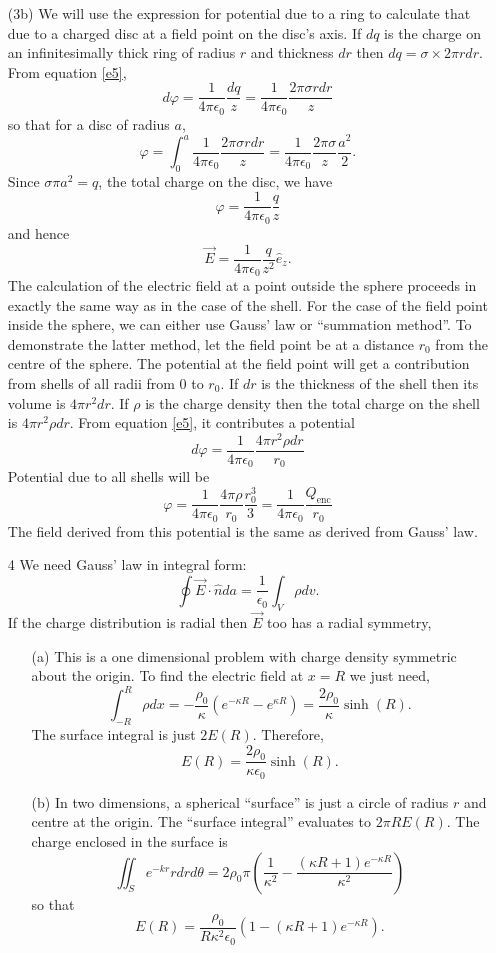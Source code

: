 \documentclass{article}
\newcommand{\un}{\hat{n}}
\newcommand{\uv}[1]{\hat{e}_{#1}}
\newcommand{\ke}{\frac{1}{4\pi\epsilon_0}}
\begin{document}
\begin{enumerate}
\item[(3b)] We will use the expression for potential due to a ring to calculate 
that due to a charged disc at a field point on the disc's axis. If $dq$ is the 
charge on an infinitesimally thick ring of radius $r$ and thickness $dr$ then 
$dq = \sigma \times 2\pi rdr$. From equation \eqref{e5},
\[
d\varphi = \ke\frac{dq}{z} = \ke\frac{2\pi\sigma rdr}{z}
\]
so that for a disc of radius $a$,
\[
\varphi = \int_0^a \ke\frac{2\pi\sigma rdr}{z} = \ke\frac{2\pi\sigma}{z}\frac{a^2}{2}.
\]
Since $\sigma\pi a^2 = q$, the total charge on the disc, we have
\begin{equation}\label{e7}
\varphi = \ke\frac{q}{z}
\end{equation}
and hence 
\begin{equation}\label{e8}
\vec{E} = \ke \frac{q}{z^2}\uv{z}.
\end{equation}
The calculation of the electric field at a point outside the sphere proceeds in
exactly the same way as in the case of the shell. For the case of the field point 
inside the sphere, we can either use Gauss' law or ``summation method''. To
demonstrate the latter method, let the field point be at a distance $r_0$ from the
centre of the sphere. The potential at the field point will get a contribution
from shells of all radii from $0$ to $r_0$. If $dr$ is the thickness of the shell
then its volume is $4\pi r^2dr$. If $\rho$ is the charge density then the total
charge on the shell is $4\pi r^2\rho dr$. From equation \eqref{e5}, it contributes
a potential
\[
d\varphi = \ke \frac{4\pi r^2\rho dr}{r_0}
\]
Potential due to all shells will be
\[
\varphi = \ke\frac{4\pi\rho}{r_0}\frac{r_0^3}{3} = \ke\frac{Q_{\text{enc}}}{r_0}
\]
The field derived from this potential is the same as derived from Gauss' law.

\item[4] We need Gauss' law in integral form:
\[
\oint\vec{E}\cdot\un da = \frac{1}{\epsilon_0}\int_V \rho dv.
\]
If the charge distribution is radial then $\vec{E}$ too has a radial symmetry,
\begin{enumerate}
\item[(a)] This is a one dimensional problem with charge density symmetric about
the origin. To find the electric field at $x = R$ we just need,
\[
\int_{-R}^R \rho dx = -\frac{\rho_0}{\kappa}(e^{-\kappa R} - e^{\kappa R})
= \frac{2\rho_0}{\kappa}\sinh(R).
\]
The surface integral is just $2E(R)$. Therefore,
\[
E(R) = \frac{2\rho_0}{\kappa\epsilon_0}\sinh(R).
\]

\item[(b)] In two dimensions, a spherical ``surface'' is just a circle of radius
$r$ and centre at the origin. The ``surface integral'' evaluates to $2\pi RE(R)$.
The charge enclosed in the surface is
\[
\iint_S e^{-kr}rdrd\theta = 
2\rho_0\pi\left(\frac{1}{\kappa^2} - \frac{(\kappa R + 1)e^{-\kappa R}}{\kappa^2}\right)
\]
so that
\[
E(R) = \frac{\rho_0}{R\kappa^2\epsilon_0}\left(1 - (\kappa R + 1)e^{-\kappa R}\right).
\]


\end{enumerate}
\end{enumerate}
\end{document}
